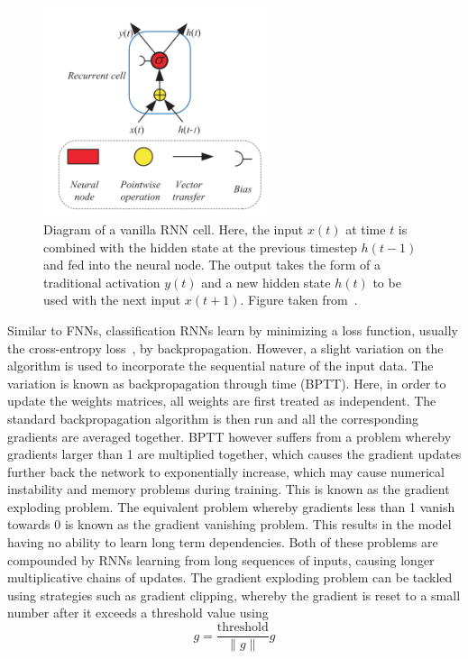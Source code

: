 \begin{figure}[ht]
  \centering
  \includegraphics[width=0.6\textwidth]{figures/rnn_cell_example.png}
  \caption{Diagram of a vanilla RNN cell. Here, the input $x(t)$ at time $t$ is
    combined with the hidden state at the previous timestep $h(t-1)$
    and fed into the neural node. The output takes the form of a traditional
    activation $y(t)$ and a new hidden state $h(t)$ to be used with the
    next input $x(t+1)$. Figure taken
  from~\cite{yu2019review}.}\label{fig:rnn_cell_example}
\end{figure}

Similar to FNNs, classification RNNs learn by minimizing a loss function,
usually the cross-entropy loss~\cite{shore1980axiomatic}, by backpropagation.
However, a slight variation on the algorithm is used to incorporate the
sequential nature of the input data. The variation is known as backpropagation
through time (BPTT). Here, in order to update the weights matrices, all weights
are first treated as independent. The standard backpropagation algorithm is then
run and all the corresponding gradients are averaged together. BPTT however
suffers from a problem whereby gradients larger than 1 are multiplied together,
which causes the gradient updates further back the network to exponentially
increase, which may cause numerical instability and memory problems during
training. This is known as the gradient exploding problem. The equivalent
problem whereby gradients less than 1 vanish towards 0 is known as the gradient
vanishing problem. This results in the model having no ability to learn long
term dependencies. Both of these problems are compounded by RNNs learning from
long sequences of inputs, causing longer multiplicative chains of updates. The
gradient exploding problem can be tackled using strategies such as gradient
clipping, whereby the gradient is reset to a small number after it exceeds a
threshold value using 
\begin{equation} 
  g = \frac{\text{threshold}}{\|g\|}g
\end{equation}

